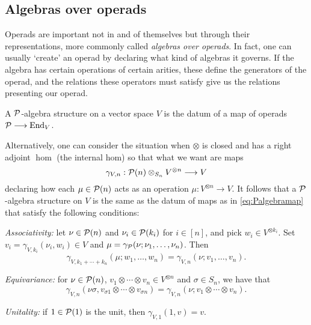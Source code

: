 
\begin{lemma}
  \end{lemma}
  
  \begin{definition}
  \end{definition}
  
  \begin{definition}
  \end{definition}
  
  \begin{proposition}
  \end{proposition}
\subsection{Algebras over operads}
Operads are important not in and of themselves 
but through their representations, more commonly
called \emph{algebras over operads}. In fact,
one can usually `create' an operad by declaring
what kind of algebras it governs. If the
algebra has certain operations of certain
arities, these define the generators of the operad,
and the relations these operators must satisfy 
give us the relations presenting our operad. 

\begin{definition}
A ${\mathcal{P}}$-algebra structure on a vector
space $V$ is the datum of a map of operads 
${\mathcal{P}} \longrightarrow \operatorname{End}_V$.
\end{definition}

Alternatively, one can consider the situation
when $\otimes$ is closed and has a right
adjoint $\hom$ (the internal hom) so that
what we want are maps
\[\label{eq:Palgebramap}
\gamma_{V,n} : 
{\mathcal{P}}(n)\otimes_{S_n} V^{\otimes n} \longrightarrow V \]
declaring how each $\mu \in{\mathcal{P}}(n)$ acts as an operation
$\mu : V^{\otimes n} \longrightarrow V$. 
It follows that a
 ${\mathcal{P}}$-algebra structure on $V$ is the same as the datum
of maps as in \ref{eq:Palgebramap} that satisfy the following
conditions:

\begin{tenumerate}
\item \emph{Associativity:} let $\nu\in {\mathcal{P}}(n)$ and
$\nu_i \in {\mathcal{P}}(k_i)$ for $i\in [n]$, and pick
$w_i \in V^{\otimes k_i}$. Set $v_i = \gamma_{V,k_i}(\nu_i,w_i) \in V$
and $\mu = \gamma_{\mathcal{P}}(\nu;\nu_1,\ldots,\nu_n)$. Then 
\[ \gamma_{V,k_1+\cdots+k_n}(\mu; w_1,\ldots,w_n) = 
	\gamma_{V,n}(\nu ;v_1,\ldots, v_n).\]
\item \emph{Equivariance:} for $\nu\in{\mathcal{P}}(n)$, $v_1\otimes\cdots \otimes v_n \in V^{\otimes n}$
and $\sigma\in S_n$, we have that
\[ \gamma_{V,n}(\nu \sigma, v_{\sigma 1} \otimes \cdots \otimes v_{\sigma n}) = \gamma_{V,n}(\nu; v_1\otimes\cdots \otimes v_n). \]
\item \emph{Unitality:} if $1\in{\mathcal{P}}(1)$ is the unit, then
$\gamma_{V,1}(1,v) = v$.  
\end{tenumerate}


